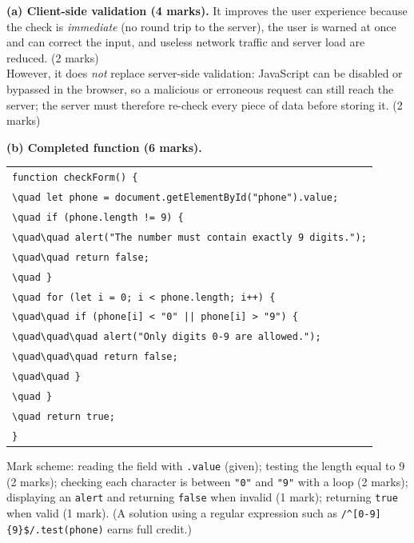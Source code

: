 \documentclass[11pt]{article}
\begin{document}
\begin{corrige}
\textbf{(a) Client-side validation (4 marks).} It improves the user experience because the check is \emph{immediate} (no round trip to the server), the user is warned at once and can correct the input, and useless network traffic and server load are reduced. \hfill(2 marks)\\
However, it does \emph{not} replace server-side validation: JavaScript can be disabled or bypassed in the browser, so a malicious or erroneous request can still reach the server; the server must therefore re-check every piece of data before storing it. \hfill(2 marks)

\textbf{(b) Completed function (6 marks).}
\begin{center}
\begin{tabular}{l}
\texttt{function checkForm() \{}\\
\texttt{\textbackslash{}quad let phone = document.getElementById("phone").value;}\\
\texttt{\textbackslash{}quad if (phone.length != 9) \{}\\
\texttt{\textbackslash{}quad\textbackslash{}quad alert("The number must contain exactly 9 digits.");}\\
\texttt{\textbackslash{}quad\textbackslash{}quad return false;}\\
\texttt{\textbackslash{}quad \}}\\
\texttt{\textbackslash{}quad for (let i = 0; i < phone.length; i++) \{}\\
\texttt{\textbackslash{}quad\textbackslash{}quad if (phone[i] < "0" || phone[i] > "9") \{}\\
\texttt{\textbackslash{}quad\textbackslash{}quad\textbackslash{}quad alert("Only digits 0-9 are allowed.");}\\
\texttt{\textbackslash{}quad\textbackslash{}quad\textbackslash{}quad return false;}\\
\texttt{\textbackslash{}quad\textbackslash{}quad \}}\\
\texttt{\textbackslash{}quad \}}\\
\texttt{\textbackslash{}quad return true;}\\
\texttt{\}}
\end{tabular}
\end{center}
Mark scheme: reading the field with \texttt{.value} (given); testing the length equal to 9 (2 marks); checking each character is between \texttt{"0"} and \texttt{"9"} with a loop (2 marks); displaying an \texttt{alert} and returning \texttt{false} when invalid (1 mark); returning \texttt{true} when valid (1 mark). (A solution using a regular expression such as \texttt{/\textasciicircum{}[0-9]\{9\}\$/.test(phone)} earns full credit.)


\end{corrige}
\end{document}
